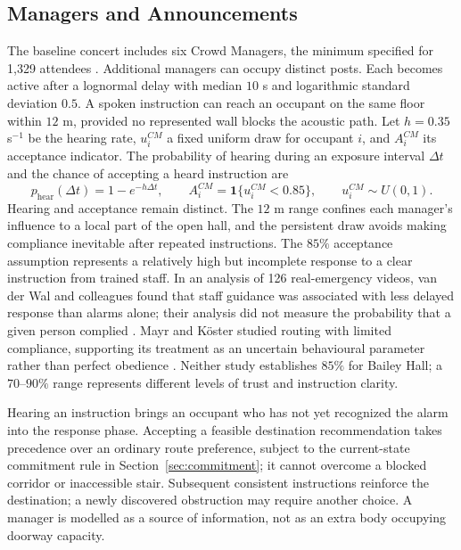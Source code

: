 \documentclass[11pt,a4paper]{article}
\newcommand{\ind}{\mathbf{1}}
\begin{document}


\subsection{Managers and Announcements}

The baseline concert includes six Crowd Managers, the minimum specified for 1,329 attendees \cite{brief}. Additional managers can occupy distinct posts. Each becomes active after a lognormal delay with median $10$ s and logarithmic standard deviation $0.5$. A spoken instruction can reach an occupant on the same floor within $12$ m, provided no represented wall blocks the acoustic path. Let $h=0.35$ s$^{-1}$ be the hearing rate, $u_i^{CM}$ a fixed uniform draw for occupant $i$, and $A_i^{CM}$ its acceptance indicator. The probability of hearing during an exposure interval $\Delta t$ and the chance of accepting a heard instruction are
\begin{equation}\label{eq:manager}
p_{\mathrm{hear}}(\Delta t)=1-e^{-h\Delta t},\qquad
A_i^{CM}=\ind\{u_i^{CM}<0.85\},\qquad u_i^{CM}\sim U(0,1).
\end{equation}
Hearing and acceptance remain distinct. The $12$ m range confines each manager's influence to a local part of the open hall, and the persistent draw avoids making compliance inevitable after repeated instructions. The $85\%$ acceptance assumption represents a relatively high but incomplete response to a clear instruction from trained staff. In an analysis of 126 real-emergency videos, van der Wal and colleagues found that staff guidance was associated with less delayed response than alarms alone; their analysis did not measure the probability that a given person complied \cite{vanderwal}. Mayr and K\"oster studied routing with limited compliance, supporting its treatment as an uncertain behavioural parameter rather than perfect obedience \cite{mayr}. Neither study establishes $85\%$ for Bailey Hall; a $70$--$90\%$ range represents different levels of trust and instruction clarity.

Hearing an instruction brings an occupant who has not yet recognized the alarm into the response phase. Accepting a feasible destination recommendation takes precedence over an ordinary route preference, subject to the current-state commitment rule in Section~\ref{sec:commitment}; it cannot overcome a blocked corridor or inaccessible stair. Subsequent consistent instructions reinforce the destination; a newly discovered obstruction may require another choice. A manager is modelled as a source of information, not as an extra body occupying doorway capacity.
\end{document}
